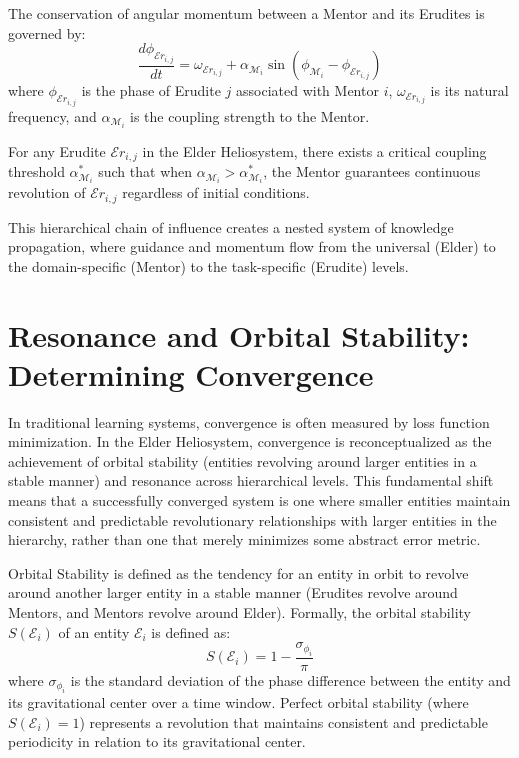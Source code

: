 \begin{proposition}
The conservation of angular momentum between a Mentor and its Erudites is governed by:
\begin{equation}
\frac{d\phi_{\mathcal{E}r_{i,j}}}{dt} = \omega_{\mathcal{E}r_{i,j}} + \alpha_{\mathcal{M}_i} \sin(\phi_{\mathcal{M}_i} - \phi_{\mathcal{E}r_{i,j}})
\end{equation}
where $\phi_{\mathcal{E}r_{i,j}}$ is the phase of Erudite $j$ associated with Mentor $i$, $\omega_{\mathcal{E}r_{i,j}}$ is its natural frequency, and $\alpha_{\mathcal{M}_i}$ is the coupling strength to the Mentor.
\end{proposition}

\begin{corollary}
For any Erudite $\mathcal{E}r_{i,j}$ in the Elder Heliosystem, there exists a critical coupling threshold $\alpha_{\mathcal{M}_i}^*$ such that when $\alpha_{\mathcal{M}_i} > \alpha_{\mathcal{M}_i}^*$, the Mentor guarantees continuous revolution of $\mathcal{E}r_{i,j}$ regardless of initial conditions.
\end{corollary}

This hierarchical chain of influence creates a nested system of knowledge propagation, where guidance and momentum flow from the universal (Elder) to the domain-specific (Mentor) to the task-specific (Erudite) levels.

\section{Resonance and Orbital Stability: Determining Convergence}

In traditional learning systems, convergence is often measured by loss function minimization. In the Elder Heliosystem, convergence is reconceptualized as the achievement of orbital stability (entities revolving around larger entities in a stable manner) and resonance across hierarchical levels. This fundamental shift means that a successfully converged system is one where smaller entities maintain consistent and predictable revolutionary relationships with larger entities in the hierarchy, rather than one that merely minimizes some abstract error metric.

\begin{definition}
Orbital Stability is defined as the tendency for an entity in orbit to revolve around another larger entity in a stable manner (Erudites revolve around Mentors, and Mentors revolve around Elder). Formally, the orbital stability $S(\mathcal{E}_i)$ of an entity $\mathcal{E}_i$ is defined as:
\begin{equation}
S(\mathcal{E}_i) = 1 - \frac{\sigma_{\phi_i}}{\pi}
\end{equation}
where $\sigma_{\phi_i}$ is the standard deviation of the phase difference between the entity and its gravitational center over a time window. Perfect orbital stability (where $S(\mathcal{E}_i) = 1$) represents a revolution that maintains consistent and predictable periodicity in relation to its gravitational center.
\end{definition}

